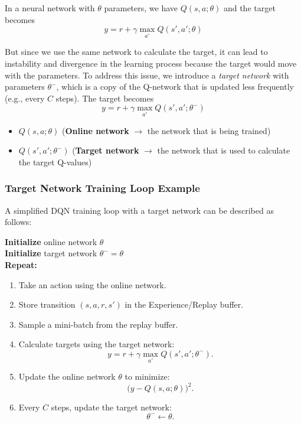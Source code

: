 \documentclass{scrartcl}
\theoremstyle{mytheoremstyle}
\theoremstyle{mytheoremstyle}
\theoremstyle{myproblemstyle}
\begin{document}
In a neural network with $\theta$ parameters, we have $Q(s, a; \theta)$ and the target becomes $$y = r + \gamma \max_{a'} Q(s', a'; \theta)$$

But since we use the same network to calculate the target, it can lead to instability and divergence in the learning process because the target would move with the parameters. To address this issue, we introduce a \textit{target network} with parameters $\theta^-$, which is a copy of the Q-network that is updated less frequently (e.g., every $C$ steps). The target becomes $$y = r + \gamma \max_{a'} Q(s', a'; \theta^-)$$

\begin{itemize}
    \item $Q(s, a; \theta)$ (\textbf{Online network} $\rightarrow$ the network that is being trained)
    \item $Q(s', a'; \theta^-)$ (\textbf{Target network} $\rightarrow$ the network that is used to calculate the target Q-values)
\end{itemize}

\newpage

\subsubsection{Target Network Training Loop Example}

A simplified DQN training loop with a target network can be described as follows:
\begin{tcolorbox}[
        colback=blue!5!white,
        colframe=blue!60!black,
        title=\textbf{DQN Target-Network Pseudocode},
        sharp corners,
        boxrule=0.8pt
    ]
    \textbf{Initialize} online network $\theta$\\
    \textbf{Initialize} target network $\theta^- = \theta$\\[2pt]

    \textbf{Repeat:}
    \begin{enumerate}[leftmargin=*, itemsep=0pt]
        \item Take an action using the online network.
        \item Store transition $(s, a, r, s')$ in the Experience/Replay buffer.
        \item Sample a mini-batch from the replay buffer.
        \item Calculate targets using the target network:
              \[
                  y = r + \gamma \max_{a'} Q(s', a'; \theta^-).
              \]
        \item Update the online network $\theta$ to minimize:
              \[
                  \bigl(y - Q(s,a;\theta)\bigr)^2.
              \]
        \item Every $C$ steps, update the target network:
              \[
                  \theta^- \leftarrow \theta.
              \]
    \end{enumerate}
\end{tcolorbox}
\end{document}
